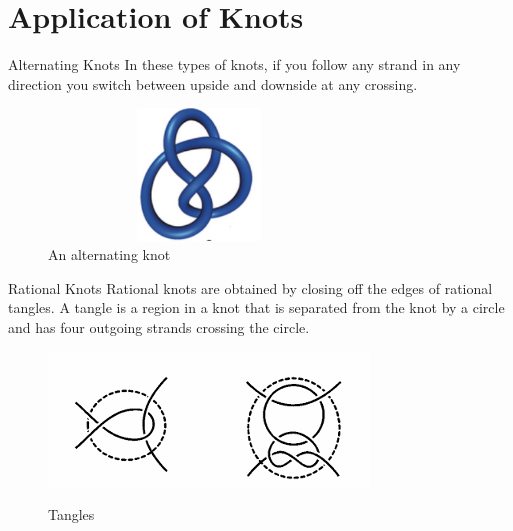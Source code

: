 \section{Application of Knots}
\begin{frame}{Alternating Knots}
 In these types of knots, if you follow any strand in any direction you switch between upside and downside at any crossing.
\begin{figure}
    \centering
    \includegraphics[height = 3.5cm, width= 8cm]{images/realalterknot.png}
    \caption{An alternating knot}
    \label{alterknot}
\end{figure}
\cite{https://doi.org/10.1002/anie.201702531}
\end{frame}
\begin{frame}{Rational Knots}
Rational knots are obtained by closing off the edges of rational tangles. A tangle is a region in a knot that is separated from the knot by a circle and has four outgoing strands crossing the circle. 
\begin{figure}[h]
    \includegraphics[width=0.6\linewidth]{images/tangles.png}
    \caption{Tangles}
    \label{tangles}
\cite{adams2004knot}
\end{figure}
\end{frame}
